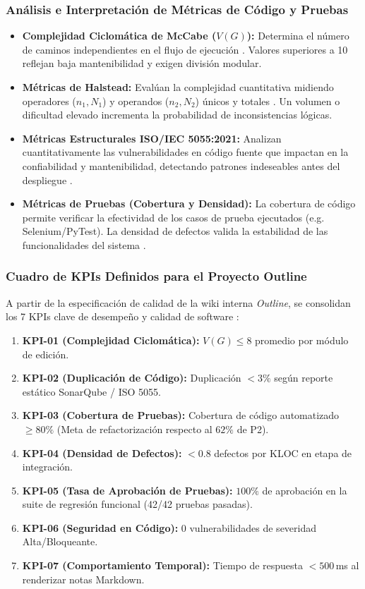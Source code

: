 \documentclass[12pt, letterpaper]{article}
\begin{document}
\subsubsection{Análisis e Interpretación de Métricas de Código y Pruebas}

\begin{itemize}
    \item \textbf{Complejidad Ciclomática de McCabe ($V(G)$):} Determina el número de caminos independientes en el flujo de ejecución \parencite{mccabe1976}. Valores superiores a 10 reflejan baja mantenibilidad y exigen división modular.
    \item \textbf{Métricas de Halstead:} Evalúan la complejidad cuantitativa midiendo operadores ($n_1, N_1$) y operandos ($n_2, N_2$) únicos y totales \parencite{galin2018}. Un volumen o dificultad elevado incrementa la probabilidad de inconsistencias lógicas.
    \item \textbf{Métricas Estructurales ISO/IEC 5055:2021:} Analizan cuantitativamente las vulnerabilidades en código fuente que impactan en la confiabilidad y mantenibilidad, detectando patrones indeseables antes del despliegue \parencite{iso5055}.
    \item \textbf{Métricas de Pruebas (Cobertura y Densidad):} La cobertura de código permite verificar la efectividad de los casos de prueba ejecutados (e.g. Selenium/PyTest). La densidad de defectos valida la estabilidad de las funcionalidades del sistema \parencite{istqb2024}.
\end{itemize}

\subsubsection{Cuadro de KPIs Definidos para el Proyecto Outline}

A partir de la especificación de calidad de la wiki interna \textit{Outline}, se consolidan los 7 KPIs clave de desempeño y calidad de software \parencite{pressman2020}:

\begin{enumerate}
    \item \textbf{KPI-01 (Complejidad Ciclomática):} $V(G) \le 8$ promedio por módulo de edición.
    \item \textbf{KPI-02 (Duplicación de Código):} Duplicación $< 3\%$ según reporte estático SonarQube / ISO 5055.
    \item \textbf{KPI-03 (Cobertura de Pruebas):} Cobertura de código automatizado $\ge 80\%$ (Meta de refactorización respecto al $62\%$ de P2).
    \item \textbf{KPI-04 (Densidad de Defectos):} $< 0.8$ defectos por KLOC en etapa de integración.
    \item \textbf{KPI-05 (Tasa de Aprobación de Pruebas):} $100\%$ de aprobación en la suite de regresión funcional (42/42 pruebas pasadas).
    \item \textbf{KPI-06 (Seguridad en Código):} 0 vulnerabilidades de severidad Alta/Bloqueante.
    \item \textbf{KPI-07 (Comportamiento Temporal):} Tiempo de respuesta $< 500$\,ms al renderizar notas Markdown.
\end{enumerate}
\end{document}
